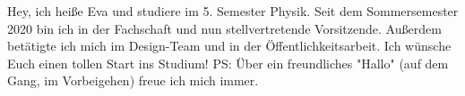 \begin{multicols}{2}
\vspace{-1.3cm}

{
Hey, ich heiße Eva und studiere im 5. Semester Physik. Seit dem Sommersemester 2020 bin ich in der Fachschaft und nun stellvertretende Vorsitzende. Außerdem betätigte ich mich im Design-Team und in der Öffentlichkeitsarbeit. 
Ich wünsche Euch einen tollen Start ins Studium! PS: Über ein freundliches "Hallo" (auf dem Gang, im Vorbeigehen) freue ich mich immer.
} 

\vspace{-1.3cm}


\end{multicols}
